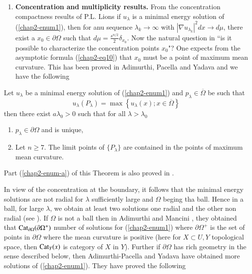 \begin{enumerate}[{\rm \bf 1.}]
\item \textbf{Concentration and multiplicity results.} From the concentration compactness results of P.L. Lions \cite{chap2-key17} if $u_{\lambda}$ is a minimal energy solution of (\ref{chap2-enum1}), then for anu sequence $\lambda_{k} \rightarrow \infty$ with $|\nabla u_{\lambda_{k}}|^{2}dx \rightarrow d\mu$, there exist a $x_{0}\in \partial\Omega$ such that $d\mu = \frac{s^{n/2}}{2}\delta_{x_{0}}$. Now the natural question in ``is it possible to characterize the concentration points $x_{0}$"? One expects from the asymptotic formula (\ref{chap2-eq10}) that $x_{0}$ must be a point of maximum mean curvature. This has been proved in Adimurthi, Pacella and Yadava \cite{chap2-key7} and we have the following
\end{enumerate}

\begin{theorem}\label{chap2-thm6}
Let $u_{\lambda}$ be a minimal energy solution of (\ref{chap2-enum1}) and $p_{\lambda} \in \overline{\Omega}$ be such that
$$
u_{\lambda}(P_{\lambda}) = \max\left\{u_{\lambda}(x) ; x\in \overline{\Omega}\right\}
$$
then there exist $a \lambda_{0} > 0$ such that for all $\lambda > \lambda_{0}$
\begin{enumerate}[{\rm a)}]
\item $p_{\lambda} \in \partial\Omega$ and is unique,\label{chap2-enum-a}
\item Let $n\geq 7$. The limit points of $\{P_{\lambda}\}$ are contained in the points of maximum mean curvature.\label{chap2-enum-b)} 
\end{enumerate}
\end{theorem}
Part (\ref{chap2-enum-a}) of this Theorem is also proved in \cite{chap2-key19}.

In view of the concentration at the boundary, it follows that the minimal energy solutions are not radial for $\lambda$ sufficiently large and $\Omega$ beging tha ball. Hence in a ball, for large $\lambda$, we obtain at  least two solutions one radial and the other non radial (see \cite{chap2-key5}). If $\Omega$ is not a ball then in Adimurthi and Mancini \cite{chap2-key2}, they obtained that $\operatorname{Cat}_{\partial\Omega}(\partial\Omega^{+})$ number of solutions for (\ref{chap2-enum1}) where $\partial\Omega^{+}$ is the set of points in $\partial\Omega$ where the mean curvature is positive (here for $X \subset U, Y$ topological space, then $\operatorname{Cat}_{Y}(x)$ is category of $X$ in $Y$). Further if $\partial\Omega$ has rich geometry in the sense described below, then Adimurthi-Pacella and Yadava \cite{chap2-key7} have obtained more solutions of (\ref{chap2-enum1}). They have proved the following

